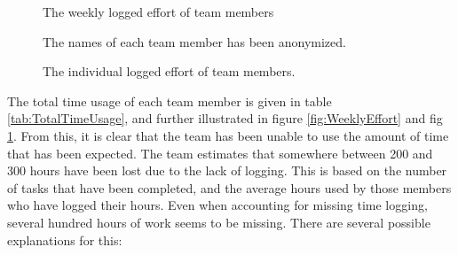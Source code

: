 \documentclass[11pt,a4paper,titlepage,oneside]{report}
\begin{document}
\begin{figure}[ht!]
\begin{center}
\caption{The weekly logged effort of team members}
\label{fig:WeeklyEffort}
\caption{The individual logged effort of team members.}The names of each team member has been anonymized.
\label{fig:IndividualEffort}
\end{center}
\end{figure}



The total time usage of each team member is given in table \ref{tab:TotalTimeUsage}, and further illustrated in figure \ref{fig:WeeklyEffort} and fig \ref{fig:IndividualEffort}. From this, it is clear that the team has been unable to use the amount of time that has been expected. The team estimates that somewhere between 200 and 300 hours have been lost due to the lack of logging. This is based on the number of tasks that have been completed, and the average hours used by those members who have logged their hours. Even when accounting for missing time logging, several hundred hours of work seems to be missing. There are several possible explanations for this:
\end{document}
